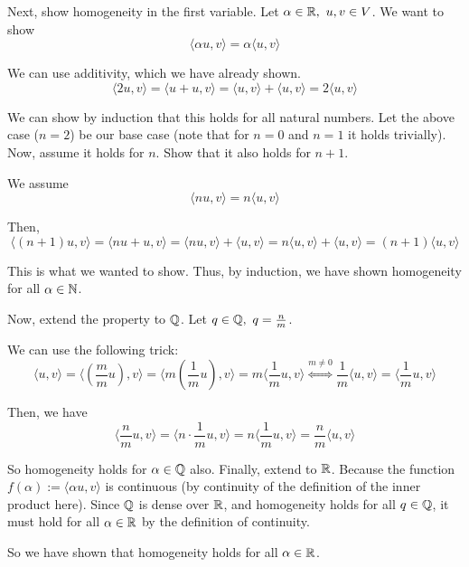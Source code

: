 \documentclass[12pt]{article}
\begin{document}
\begin{enumerate}[label=\alph*)]
\begin{itemize}
\begin{itemize}
            Next, show homogeneity in the first variable. Let $\alpha \in \mathbb{R},\ u, v \in V$. We want to show
            $$
                \langle \alpha u, v \rangle = \alpha \langle u, v \rangle
            $$

            We can use additivity, which we have already shown.
            $$
                \langle 2 u, v \rangle = \langle u + u, v \rangle = \langle u, v \rangle + \langle u, v \rangle = 2 \langle u, v \rangle
            $$

            We can show by induction that this holds for all natural numbers. Let the above case ($n = 2$) be our base case (note that for $n = 0$ and $n = 1$ it holds trivially). Now, assume it holds for $n$. Show that it also holds for $n + 1$.
            
            We assume
            $$
                \langle n u, v \rangle = n \langle u, v \rangle
            $$

            Then,
            $$
                \langle (n + 1) u, v \rangle = \langle nu + u, v \rangle = \langle nu, v \rangle + \langle u, v \rangle = n \langle u, v \rangle + \langle u, v \rangle = (n + 1) \langle u, v \rangle
            $$

            This is what we wanted to show. Thus, by induction, we have shown homogeneity for all $\alpha \in \mathbb{N}$.

            Now, extend the property to $\mathbb{Q}$. Let $q \in \mathbb{Q},\ q = \frac{n}{m}$.

            We can use the following trick:
            $$
                \langle u, v \rangle = \langle (\frac{m}{m} u), v \rangle = \langle m(\frac{1}{m} u), v \rangle = m \langle \frac{1}{m} u, v \rangle \overset{m \neq 0}\iff \frac{1}{m}\langle u, v \rangle = \langle \frac{1}{m} u, v \rangle
            $$

            Then, we have
            $$
                \langle \frac{n}{m} u, v \rangle = \langle n \cdot\frac{1}{m} u, v \rangle = n \langle \frac{1}{m} u, v \rangle = \frac{n}{m} \langle u, v \rangle
            $$

            So homogeneity holds for $\alpha \in \mathbb{Q}$ also. Finally, extend to $\mathbb{R}$. Because the function $f(\alpha) := \langle \alpha u, v \rangle$ is continuous (by continuity of the definition of the inner product here). Since $\mathbb{Q}$ is dense over $\mathbb{R}$, and homogeneity holds for all $q \in \mathbb{Q}$, it must hold for all $\alpha \in \mathbb{R}$ by the definition of continuity.

            So we have shown that homogeneity holds for all $\alpha \in \mathbb{R}$.


\end{itemize}
\end{itemize}
\end{enumerate}
\end{document}
